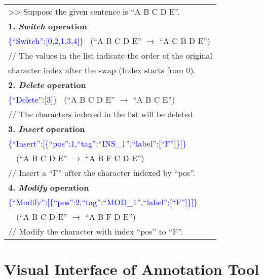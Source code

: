 \documentclass[11pt]{article}
\newcommand{\blue}[1]{\textcolor{blue}{#1}}
\begin{document}
\begin{tcolorbox}[colback=white,colframe=black,arc=1mm, auto outer arc,
                  boxrule=0.5pt,
                  left=5pt,
                  top=1pt,
                  bottom=1pt
                  ]
                  
    \begin{tabular}[c]{@{}l@{}}
    \small >> Suppose the given sentence is ``A B C D E''.   \\
    \small \textbf{1. \emph{Switch} operation} \\
    \small \blue{\{``Switch'':[0,2,1,3,4]\}} \, (``A B C D E'' $\to$ ``A C B D E'') \\ 
    \small // The values in the list indicate the order of the original \\
    \small character index after the swap (Index starts from 0). \\
    \small \textbf{2. \emph{Delete} operation} \\
    \small \blue{\{``Delete'':[3]\}} \quad \quad \quad  \quad \, (``A B C D E'' $\to$ ``A B C E'') \\ 
    \small // The characters indexed in the list will be deleted. \\
    \small \textbf{3. \emph{Insert} operation} \\
    \small \blue{\{``Insert'':[\{``pos'':1,``tag'':``INS\_1'',``label'':[``F'']\}]\}} \\
    \small \quad \quad \quad \quad \quad \quad  \quad \quad \, \,  (``A B C D E'' $\to$ ``A B F C D E'') \\ 
    \small // Insert a ``F'' after the character indexed by ``pos''. \\
    \small \textbf{4. \emph{Modify} operation} \\
    \small \blue{\{``Modify'':[\{``pos'':2,``tag'':``MOD\_1'',``label'':[``F'']\}]\}} \\
    \small \quad \quad \quad \quad \quad \quad  \quad \quad \quad \, \,  (``A B C D E'' $\to$ ``A B F D E'') \\ 
    \small // Modify the character with index ``pos'' to ``F''.
	\end{tabular}
\end{tcolorbox} 
\section{Visual Interface of Annotation Tool}
\label{appendix:annotool}
\end{document}
